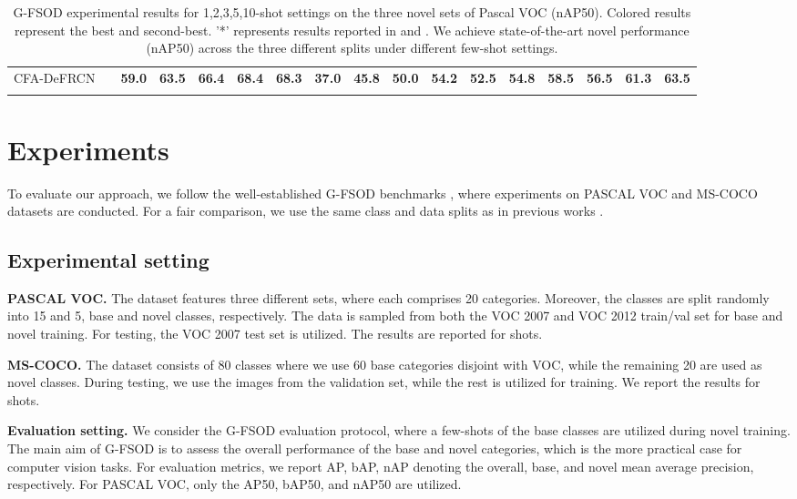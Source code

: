 \documentclass[10pt,twocolumn,letterpaper]{article}
\newcommand{\cmark}{\ding{51}}\newcommand{\xmark}{\ding{55}}\newcommand\minisection[1]{\vspace{1mm}\noindent \textbf{#1}}
\newcommand{\best}[1]{\color{red}\textbf{#1}}
\begin{document}
\begin{table*}
\begin{tabular}{c| c | c c c c c | c c c c c | c c c c c}
      \rowcolor[HTML]{EFEFEF}
      CFA-DeFRCN& \cmark & \best{59.0} & \best{63.5} & \best{66.4} & \best{68.4} & \best{68.3} & \best{37.0} & \best{45.8} & \best{50.0} & \best{54.2} & \best{52.5} & \best{54.8} & \best{58.5} & \best{56.5} & \best{61.3} & \best{63.5} \\
      \Xhline{1pt}
    \end{tabular}
    \caption{G-FSOD experimental results for 1,2,3,5,10-shot settings on the three novel sets of Pascal VOC (nAP50). Colored results represent the {\color{red}best} and {\color{blue}second-best}. '*' represents results reported in \cite{gfsod} and \cite{defrcn}. We achieve state-of-the-art novel performance (nAP50) across the three different splits under different few-shot settings.}
    \vspace{-2em}
    \label{tab:voc-novel}
\end{table*} 
\section{Experiments}
To evaluate our approach, we follow the well-established G-FSOD benchmarks \cite{TFA, gfsod, defrcn}, where experiments on PASCAL VOC \cite{pascalvoc} and MS-COCO \cite{coco} datasets are conducted. For a fair comparison, we use the same class and data splits as in previous works \cite{FSRW, TFA, MPSR}. 

\subsection{Experimental setting}

\textbf{PASCAL VOC.} The dataset features three different sets, where each comprises 20 categories. Moreover, the classes are split randomly into 15 and 5, base and novel classes, respectively. The data is sampled from both the VOC 2007 and VOC 2012 train/val set for base and novel training. For testing, the VOC 2007 test set is utilized. The results are reported for  shots.

\textbf{MS-COCO.} The dataset consists of 80 classes where we use 60 base categories disjoint with VOC, while the remaining 20 are used as novel classes. During testing, we use the  images from the validation set, while the rest is utilized for training. We report the results for  shots. 

\textbf{Evaluation setting.}  We consider the G-FSOD evaluation protocol, where a few-shots of the base classes are utilized during novel training. The main aim of G-FSOD is to assess the overall performance of the base and novel categories, which is the more practical case for computer vision tasks. For evaluation metrics, we report AP, bAP, nAP denoting the overall, base, and novel mean average precision, respectively. For PASCAL VOC, only the AP50, bAP50, and nAP50 are utilized.
\end{document}
